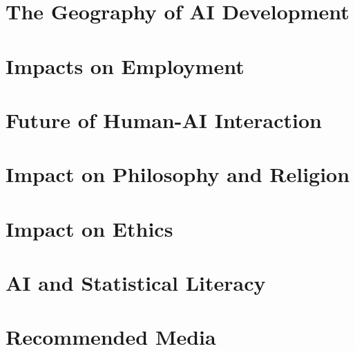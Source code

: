 \documentclass[10pt]{beamer}
\begin{document}

  \section{The Geography of AI Development}
  \section{Impacts on Employment}
  \section{Future of Human-AI Interaction}
  \section{Impact on Philosophy and Religion}
  \section{Impact on Ethics}
  \section{AI and Statistical Literacy}
  \section{Recommended Media}
  
\end{document}
